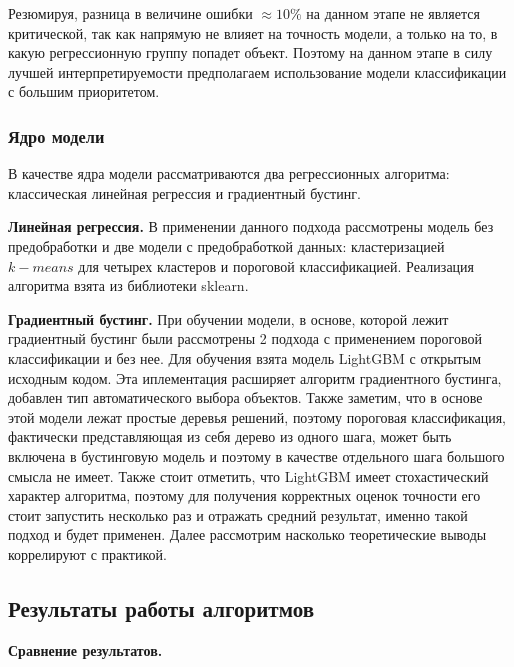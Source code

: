 \documentclass[12pt,a4paper]{article} %
\begin{document}
Резюмируя, разница в величине ошибки $\approx10\%$ на данном этапе не является критической, так как напрямую не влияет на точность модели, а только на то, в какую регрессионную группу попадет объект. Поэтому на данном этапе в силу лучшей интерпретируемости предполагаем использование модели классификации с большим приоритетом.  

\subsubsection{Ядро модели}

В качестве ядра модели рассматриваются два регрессионных алгоритма: классическая линейная регрессия и градиентный бустинг. 

\textbf{Линейная регрессия.} В применении данного подхода рассмотрены модель без предобработки и две модели с предобработкой данных: кластеризацией $k-means$ для четырех кластеров и пороговой классификацией. Реализация алгоритма взята из библиотеки sklearn.

\textbf{Градиентный бустинг.} При обучении модели, в основе, которой лежит градиентный бустинг были рассмотрены 2 подхода с применением пороговой классификации и без нее. Для обучения взята модель LightGBM\cite{Chen2} с открытым исходным кодом. Эта иплементация расширяет алгоритм градиентного бустинга, добавлен тип автоматического выбора объектов. Также заметим, что в основе этой модели лежат простые деревья решений, поэтому пороговая классификация, фактически представляющая из себя дерево из одного шага, может быть включена в бустинговую модель и поэтому в качестве отдельного шага большого смысла не имеет. Также стоит отметить, что LightGBM имеет стохастический характер алгоритма, поэтому для получения корректных оценок точности его стоит запустить несколько раз и отражать средний результат, именно такой подход и будет применен. Далее рассмотрим насколько теоретические выводы коррелируют с практикой.

\newpage

\subsection{Результаты работы алгоритмов}

\textbf{Сравнение результатов.} 
\end{document}
